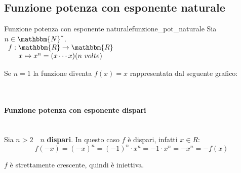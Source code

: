 \documentclass[12pt]{report}
\newcounter{definition}
\newcommand{\nmu}{}
\begin{document}
	\subsection{Funzione potenza con esponente naturale}
	\begin{definition}{\nmu Funzione potenza con esponente naturale}{funzione_pot_naturale}
		Sia $n \in \mathbbm{N}^*$. \\
		$\begin{array}{l}
			f: \mathbbm{R} \to \mathbbm{R} \\
			\phantom{f:\ }x \mapsto x^n = (x \cdots x) (n\ volte)
		\end{array}$ \\
	\end{definition}
	Se $n=1$ la funzione diventa $f(x) = x$ rappresentata dal seguente grafico: \\
	\begin{center}
		 \\
	\end{center}
	\paragraph{Funzione potenza con esponente dispari} \quad \\
	Sia $n > 2 \quad n$ \textbf{dispari}. In questo caso $f$ è dispari, infatti $x \in R$:
	\[
	f(-x) = (-x)^n = (-1)^n \cdot x^n = -1 \cdot x^n = -x^n = -f(x)
	\]
	\begin{center}
	\end{center}
	$f$ è strettamente crescente, quindi è iniettiva. \\
\end{document}
